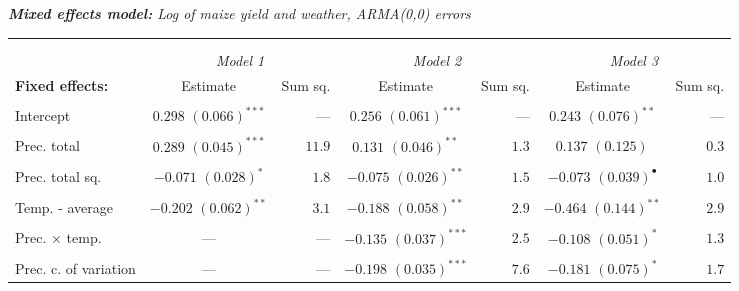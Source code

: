 \documentclass[a4paper,12pt]{article}
\begin{document}
{\hspace{-1.5cm}
\begin{threeparttable}

\singlespacing
\caption{\textit{\textbf{Mixed  effects model:} Log of maize yield and weather, ARMA(0,0) errors}}

\label{Models1} 

\begin{small}
\begin{tabular}{lcrcrcr} 

\hline \vspace{-0.2cm} \\
\vspace{-0.2cm} \\
  \multicolumn{1}{l}{\vspace{0.1cm}\textbf{ }}  &\multicolumn{2}{c}{\textit{Model 1}} &\multicolumn{2}{c}{\textit{Model 2}} &\multicolumn{2}{c}{\textit{Model 3}}\\
    \multicolumn{1}{l}{\vspace{0.1cm}\textbf{Fixed effects:}}&Estimate&Sum sq.&Estimate&Sum sq.&Estimate&Sum sq.\\
 \hline 
\hline
\\
\vspace{-0.2cm}Intercept&$0.298$ $(0.066)^{***}$&---&$0.256$ $(0.061)^{***}$&---&$0.243$ $(0.076)^{**}$&---\\
  \\
\vspace{-0.2cm}Prec. total&$0.289$ $(0.045)^{***}$&$11.9$&$0.131$ $(0.046)^{**}$&$1.3$&$0.137$ $(0.125)^{}$&$0.3$\\
  \\
  \vspace{-0.2cm}Prec. total sq.&$-0.071$ $(0.028)^{*}$&$1.8$&$-0.075$ $(0.026)^{**}$&$1.5$&$-0.073$ $(0.039)^{\bullet}$&$1.0$\\
  \\
  \vspace{-0.2cm}Temp. - average&$-0.202$ $(0.062)^{**}$&$3.1$&$-0.188$ $(0.058)^{**}$&$2.9$&$-0.464$ $(0.144)^{**}$&$2.9$\\
  \\
    \vspace{-0.2cm}Prec. $\times$ temp.&---&---&$-0.135$ $(0.037)^{***}$&$2.5$&$-0.108$ $(0.051)^{*}$&$1.3$\\
  \\
      \vspace{-0.2cm}Prec. c. of variation&---&---&$-0.198$ $(0.035)^{***}$&$7.6$&$-0.181$ $(0.075)^{*}$&$1.7$\\

\end{tabular}
\end{small}
\end{threeparttable}}
\end{document}

